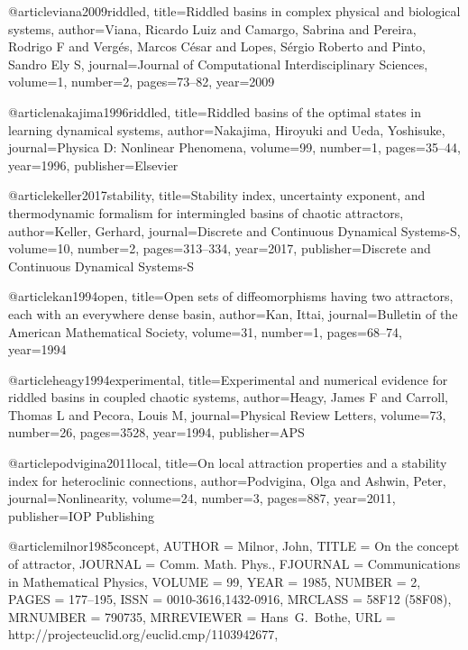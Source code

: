 @article{viana2009riddled,
  title={Riddled basins in complex physical and biological systems},
  author={Viana, Ricardo Luiz and Camargo, Sabrina and Pereira, Rodrigo F and Verg{\'e}s, Marcos C{\'e}sar and Lopes, S{\'e}rgio Roberto and Pinto, Sandro Ely S},
  journal={Journal of Computational Interdisciplinary Sciences},
  volume={1},
  number={2},
  pages={73--82},
  year={2009}
}




@article{nakajima1996riddled,
  title={Riddled basins of the optimal states in learning dynamical systems},
  author={Nakajima, Hiroyuki and Ueda, Yoshisuke},
  journal={Physica D: Nonlinear Phenomena},
  volume={99},
  number={1},
  pages={35--44},
  year={1996},
  publisher={Elsevier}
}

@article{keller2017stability,
  title={Stability index, uncertainty exponent, and thermodynamic formalism for intermingled basins of chaotic attractors},
  author={Keller, Gerhard},
  journal={Discrete and Continuous Dynamical Systems-S},
  volume={10},
  number={2},
  pages={313--334},
  year={2017},
  publisher={Discrete and Continuous Dynamical Systems-S}
}

@article{kan1994open,
  title={Open sets of diffeomorphisms having two attractors, each with an everywhere dense basin},
  author={Kan, Ittai},
  journal={Bulletin of the American Mathematical Society},
  volume={31},
  number={1},
  pages={68--74},
  year={1994}
}



@article{heagy1994experimental,
  title={Experimental and numerical evidence for riddled basins in coupled chaotic systems},
  author={Heagy, James F and Carroll, Thomas L and Pecora, Louis M},
  journal={Physical Review Letters},
  volume={73},
  number={26},
  pages={3528},
  year={1994},
  publisher={APS}
}

@article{podvigina2011local,
  title={On local attraction properties and a stability index for heteroclinic connections},
  author={Podvigina, Olga and Ashwin, Peter},
  journal={Nonlinearity},
  volume={24},
  number={3},
  pages={887},
  year={2011},
  publisher={IOP Publishing}
}

@article{milnor1985concept,
    AUTHOR = {Milnor, John},
     TITLE = {On the concept of attractor},
   JOURNAL = {Comm. Math. Phys.},
  FJOURNAL = {Communications in Mathematical Physics},
    VOLUME = {99},
      YEAR = {1985},
    NUMBER = {2},
     PAGES = {177--195},
      ISSN = {0010-3616,1432-0916},
   MRCLASS = {58F12 (58F08)},
  MRNUMBER = {790735},
MRREVIEWER = {Hans\ G.\ Bothe},
       URL = {http://projecteuclid.org/euclid.cmp/1103942677},
}

